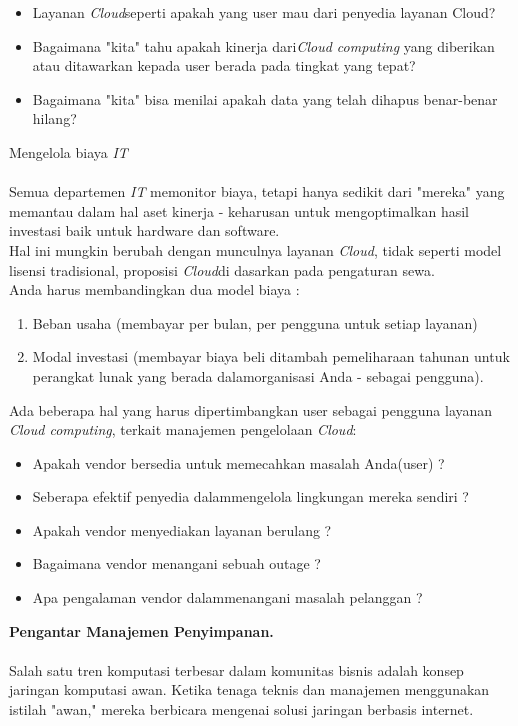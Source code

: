 \begin{itemize}
\item Layanan \textit{Cloud}seperti  apakah yang user mau dari penyedia layanan Cloud?
\item Bagaimana "kita" tahu apakah kinerja dari\textit{Cloud computing} yang diberikan atau ditawarkan kepada user berada pada tingkat yang tepat?
\item Bagaimana "kita" bisa menilai apakah data yang telah dihapus benar-benar hilang?
\end{itemize}
Mengelola biaya \textit{IT}\\\\
Semua departemen \textit{IT} memonitor biaya, tetapi hanya sedikit dari   "mereka" yang memantau dalam hal aset kinerja - keharusan untuk mengoptimalkan hasil investasi baik untuk hardware dan software.\\
Hal ini mungkin berubah dengan munculnya layanan \textit{Cloud}, tidak seperti model lisensi tradisional, proposisi \textit{Cloud}di  dasarkan pada pengaturan sewa.\\
Anda harus membandingkan dua model biaya :\\
\begin{enumerate}[label=\alph*]
\item Beban usaha (membayar per bulan,  per pengguna untuk setiap layanan)
\item Modal investasi (membayar biaya beli ditambah pemeliharaan tahunan untuk perangkat lunak yang berada dalamorganisasi  Anda - sebagai pengguna).
\end{enumerate}
Ada beberapa hal yang harus dipertimbangkan user sebagai pengguna layanan \textit{Cloud computing},  terkait manajemen pengelolaan \textit{Cloud}:\\
\begin{itemize}
\item Apakah vendor  bersedia untuk memecahkan masalah Anda(user) ?
\item Seberapa efektif  penyedia dalammengelola lingkungan mereka sendiri ?
\item Apakah vendor  menyediakan layanan berulang ?
\item Bagaimana vendor menangani sebuah outage ?
\item Apa pengalaman vendor dalammenangani  masalah pelanggan ?
\end{itemize}
\textbf{Pengantar  Manajemen Penyimpanan.}\\\\
\tab Salah satu tren komputasi terbesar dalam komunitas bisnis adalah konsep jaringan komputasi awan. Ketika tenaga teknis dan manajemen menggunakan istilah "awan," mereka berbicara mengenai  solusi jaringan berbasis internet.\\
